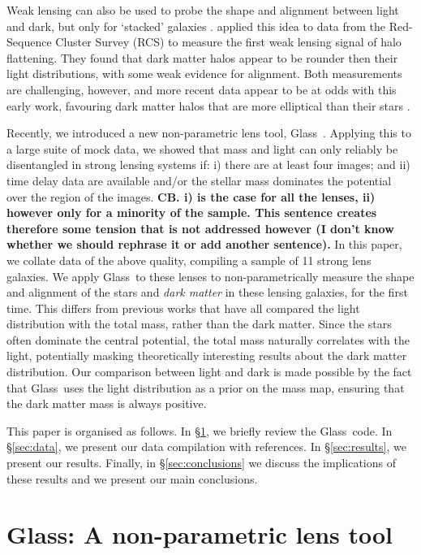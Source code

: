 \documentclass[useAMS,usenatbib]{mn2e}
\def\Glass{{\sc Glass}}
\begin{document}
Weak lensing can also be used to probe the shape and alignment between light and dark, but only for `stacked' galaxies \citep{2000astro.ph..6281B,2000ApJ...538L.113N}. \citet{2004ApJ...606...67H} applied this idea to data from the Red-Sequence Cluster Survey (RCS) to measure the first weak lensing signal of halo flattening. They found that dark matter halos appear to be rounder then their light distributions, with some weak evidence for alignment. Both measurements are challenging, however, and more recent data appear to be at odds with this early work, favouring dark matter halos that are more elliptical than their stars \citep{2006MNRAS.370.1008M,2007ApJ...669...21P,2012A&A...545A..71V}.

Recently, we introduced a new non-parametric lens tool, \Glass\  \citep{2014arXiv1401.7990C}. Applying this to a large suite of mock data, we showed that mass and light can only reliably be disentangled in strong lensing systems if: i) there are at least four images; and ii) time delay data are available and/or the stellar mass dominates the potential over the region of the images. {\bf CB. i) is the case for all the lenses, ii) however only for a minority of the sample. This sentence creates therefore some tension that is not addressed however (I don't know whether we should rephrase it or add another sentence).} In this paper, we collate data of the above quality, compiling a sample of 11 strong lens galaxies. We apply \Glass\ to these lenses to non-parametrically measure the shape and alignment of the stars and {\it dark matter}  in these lensing galaxies, for the first time. This differs from previous works that have all compared the light distribution with the total mass, rather than the dark matter. Since the stars often dominate the central potential, the total mass naturally correlates with the light, potentially masking theoretically interesting results about the dark matter distribution. Our comparison between light and dark is made possible by the fact that \Glass\ uses the light distribution as a prior on the mass map, ensuring that the dark matter mass is always positive.

This paper is organised as follows. In \S\ref{sec:glass}, we briefly review the \Glass\ code. In \S\ref{sec:data}, we present our data compilation with references. In \S\ref{sec:results}, we present our results. Finally, in \S\ref{sec:conclusions} we discuss the implications of these results and we present our main conclusions.


\section{\Glass: A non-parametric lens tool}\label{sec:glass}
\end{document}
